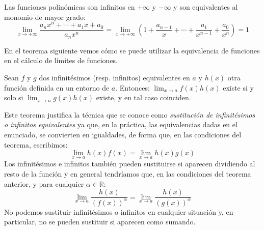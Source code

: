\begin{ejemplo}
Las funciones polinómicas son infinitos en $+\infty$ y $-\infty$ y son equivalentes al monomio de mayor grado:
\[
\lim_{x\to+\infty}
\dfrac{a_nx^n+\cdots+a_1x+a_0}{a_nx^n}
=\lim_{x\to+\infty}
\left(1+\dfrac{a_{n-1}}x+\cdots+\frac{a_1}{x^{n-1}}+\frac{a_0}{x^n} \right)=1\tag*{\fej}
\]
\end{ejemplo}

En el teorema siguiente vemos cómo se puede utilizar la equivalencia de funciones en el cálculo de límites de funciones.
%
\begin{teorema}
Sean $f$ y $g$ dos infinitésimos (resp. infinitos) equivalentes en $a$
y $h(x)$ otra función definida en un entorno de $a$. Entonces:
$\displaystyle\lim_{x\to a}f(x)h(x)$ existe si y solo si $\displaystyle\lim_{x\to a}g(x)h(x)$ existe, y en tal caso coinciden.
\end{teorema}

Este teorema justifica la técnica que se conoce como \emph{sustitución de
infinitésimos o infinitos equivalentes} ya que, en la práctica, las equivalencias dadas en el
enunciado, se convierten en igualdades, de forma que, en las condiciones del teorema, escribimos:
\[
\lim_{x\to a}{h(x)}{f(x)}=\lim_{x\to a}{h(x)}{g(x)}
\]
Los infinitésimos e infinitos también pueden sustituirse si aparecen dividiendo al resto de la función y en general tendríamos que, en las condiciones del teorema anterior, y para cualquier $\alpha\in\mathbb{R}$:
\[
\lim_{x\to a}\dfrac{h(x)}{(f(x))^\alpha}=\lim_{x\to a}\dfrac{h(x)}{(g(x))^\alpha}
\]
No podemos sustituir infinitésimos o infinitos en cualquier situación y, en particular, no se pueden sustituir si aparecen como sumando.

